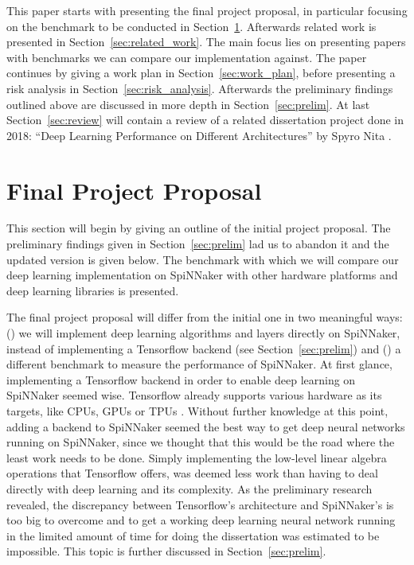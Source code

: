 \documentclass{article}
\begin{document}
This paper starts with presenting the final project
proposal, in particular focusing on the benchmark to be
conducted in Section~\ref{sec:proposal}.
Afterwards related work is presented in
Section~\ref{sec:related_work}.
The main focus lies on presenting papers with benchmarks
we can compare our implementation against.
The paper continues by giving a work plan in
Section~\ref{sec:work_plan}, before presenting a risk
analysis in Section~\ref{sec:risk_analysis}.
Afterwards the preliminary findings outlined above are
discussed in more depth in Section~\ref{sec:prelim}.
At last Section~\ref{sec:review} will contain a review of a
related dissertation project done in 2018:
``Deep Learning Performance on Different Architectures'' by
Spyro Nita \citep{nita_2018}.


\section{Final Project Proposal} %
\label{sec:proposal}

This section will begin by giving an outline of the initial
project proposal.
The preliminary findings given in Section~\ref{sec:prelim}
lad us to abandon it and the updated version is given below.
The benchmark with which we will compare our deep learning
implementation on SpiNNaker with other hardware platforms
and deep learning libraries is presented.

The final project proposal will differ from the initial one
in two meaningful ways: () we will implement
deep learning algorithms and layers directly on SpiNNaker,
instead of implementing a Tensorflow backend (see
Section~\ref{sec:prelim}) and () a different
benchmark to measure the performance of SpiNNaker.
At first glance, implementing a Tensorflow backend in order to
enable deep learning on SpiNNaker seemed wise.
Tensorflow already supports various hardware as its targets, like
CPUs, GPUs or TPUs \citep{tf2015, jouppi_2016}.
Without further knowledge at this point, adding a backend to SpiNNaker
seemed the best way to get deep neural networks running on SpiNNaker,
since we thought that this would be the road where the least work
needs to be done.
Simply implementing the low-level linear algebra operations that
Tensorflow offers, was deemed less work than having to deal directly
with deep learning and its complexity.
As the preliminary research revealed, the discrepancy between
Tensorflow's architecture and SpiNNaker's is too big to overcome and
to get a working deep learning neural network running in the limited
amount of time for doing the dissertation was estimated to
be impossible.
This topic is further discussed in Section~\ref{sec:prelim}.
\end{document}
